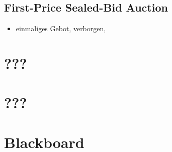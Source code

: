 \documentclass{article} %
\begin{document}
	\subsection{First-Price Sealed-Bid Auction}
	\begin{itemize}
		\item einmaliges Gebot, verborgen,
	\end{itemize}
	\section{???}
	\section{???}	
	\section{Blackboard}
\end{document}
